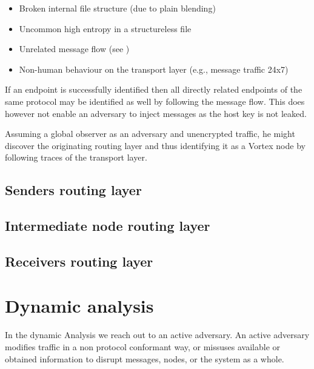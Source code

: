 \begin{itemize}
	\item Broken internal file structure (due to plain blending)
	\item Uncommon high entropy in a structureless file
	\item Unrelated message flow (see \cite{oakland2013-parrot})
	\item Non-human behaviour on the transport layer (e.g., message traffic 24x7)
\end{itemize}

If an endpoint is successfully identified then all directly related endpoints of the same protocol may be identified as well by following the message flow. This does however not enable an adversary to inject messages as the host key is not leaked. 

Assuming a global observer as an adversary and unencrypted traffic, he might discover the originating routing layer and thus identifying it as a Vortex node by following traces of the transport layer.

\section{Senders routing layer}

\section{Intermediate node routing layer}

\section{Receivers routing layer}

\chapter{Dynamic analysis}
In the dynamic Analysis we reach out to an active adversary. An active adversary modifies traffic in a non protocol conformant way, or missuses available or obtained information to disrupt messages, nodes, or the system as a whole.

